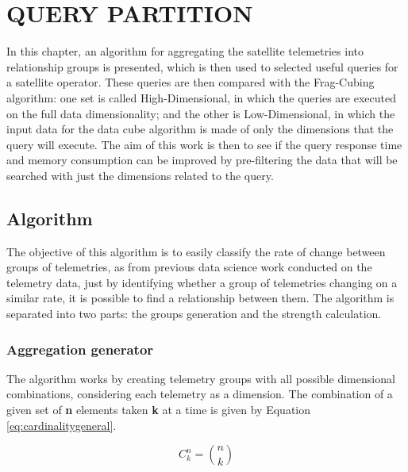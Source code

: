 
\chapter{QUERY PARTITION}\label{ch:querypart}

In this chapter, an algorithm for aggregating the satellite telemetries into relationship groups is presented, which is then used to selected useful queries for a satellite operator.
These queries are then compared with the Frag-Cubing algorithm: one set is called High-Dimensional, in which the queries are executed on the full data dimensionality; and the other is Low-Dimensional, in which the input data for the data cube algorithm is made of only the dimensions that the query will execute.
The aim of this work is then to see if the query response time and memory consumption can be improved by pre-filtering the data that will be searched with just the dimensions related to the query.

\section{Algorithm}\label{ch:querypart:heur}

The objective of this algorithm is to easily classify the rate of change between groups of telemetries, as from previous data science work conducted on the telemetry data, just by identifying whether a group of telemetries changing on a similar rate, it is possible to find a relationship between them.
The algorithm is separated into two parts: the groups generation and the strength calculation.

\hypertarget{aggregation-generator}{%
\subsection{Aggregation generator}\label{ch:querypart:heur:agg}}

The algorithm works by creating telemetry groups with all possible dimensional combinations, considering each telemetry as a dimension.
The combination of a given set of \textbf{n} elements taken \textbf{k} at a time is given by Equation \ref{eq:cardinalitygeneral}.

\begin{equation} \label{eq:cardinalitygeneral}
C_k^n = \binom{n}{k}
\end{equation}

